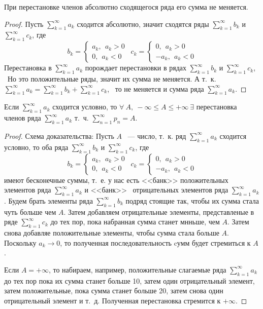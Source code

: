\documentclass[../../main.tex]{subfiles}
\begin{document}
\begin{crl*}
	При перестановке членов абсолютно сходящегося ряда его сумма не меняется.
\end{crl*}
\begin{proof}
		Пусть $\sum\limits_{k = 1}^{\infty} a_k$ сходится абсолютно,
		значит сходятся ряды $\sum\limits_{k = 1}^{\infty} b_k$ и
		$\sum\limits_{k = 1}^{\infty} c_k$, где\[b_k = \begin{cases}
			a_k, \ \ a_k > 0\\
			0, \ \ a_k < 0
		  \end{cases} \ \
		 c_k = \begin{cases}
			0, \ \ a_k > 0\\
			-a_k, \ \ a_k < 0
		  \end{cases}\]
  Перестановка в $\sum\limits_{k = 1}^{\infty} a_k$ порождает перестановки
  в рядах  $\sum\limits_{k = 1}^{\infty} b_k$ и
  $\sum\limits_{k = 1}^{\infty} c_k$, \ Но это положительные ряды,
  значит их сумма не меняется. А т.~к. $\sum\limits_{k = 1}^{\infty} a_k
   = \sum\limits_{k = 1}^{\infty} b_k + \sum\limits_{k = 1}^{\infty} c_k$,
   \ то не меняется и сумма ряда $\sum\limits_{k = 1}^{\infty} a_k$.
\end{proof}
\begin{thm}
	Если $\sum\limits_{k = 1}^{\infty} a_k$ сходится условно, то
	$\forall \ A, \ - \infty \leq A \leq + \infty \ \exists$
	перестановка членов ряда $\sum\limits_{k = 1}^{\infty} a_k$ т.~ч.
	$\sum\limits_{n = 1}^{\infty} p_n = A$.
	\begin{proof}
		Схема доказательства: Пусть $A$ ~--- число, т.~к. ряд
		$\sum\limits_{k = 1}^{\infty} a_k$ сходится условно, то оба ряда
		$\sum\limits_{k = 1}^{\infty} b_k$ и
		$\sum\limits_{k = 1}^{\infty} c_k$, где
		\[b_k = \begin{cases}
			a_k, \ \ a_k > 0\\
			0, \ \ a_k < 0
		  \end{cases} \ \
		 c_k = \begin{cases}
			0, \ \ a_k > 0\\
			-a_k, \ \ a_k < 0
		  \end{cases}\]
		  имеют бесконечные суммы, т.~е. у нас есть <<банк>> положительных
		  элементов	ряда $\sum\limits_{k = 1}^{\infty} a_k$ и <<банк>> \
		  отрицательных элементов ряда $\sum\limits_{k = 1}^{\infty} a_k$.
		  Будем брать элементы ряда $\sum\limits_{k = 1}^{\infty} b_k$
		  подряд стоящие так, чтобы их сумма стала чуть больше чем $A$.
		  Затем добавляем отрицательные элементы, представленые в ряде
		  $\sum\limits_{k = 1}^{\infty} c_k$ до тех пор, пока набранная
		  сумма станет мнньше, чем $A$. Затем снова добавляе положительные
		  элементы, чтобы сумма стала больше $A$. Поскольку $a_k \to 0$,
		  то полученная последовательность cумм будет стремиться к $A$.

		  Если $A = +\infty$, то набираем, например, положительные
		  слагаемые ряда $\sum\limits_{k = 1}^{\infty} a_k$ до тех пор
		  пока их сумма станет больше 10, затем один отрицательный элемент,
		  затем положительные, пока сумма станет больше 20, затем снова один
		  отрицательный элемент и т.~д. Полученная перестановка стремится к
		  $+ \infty$.
	\end{proof}
\end{thm}
\end{document}
